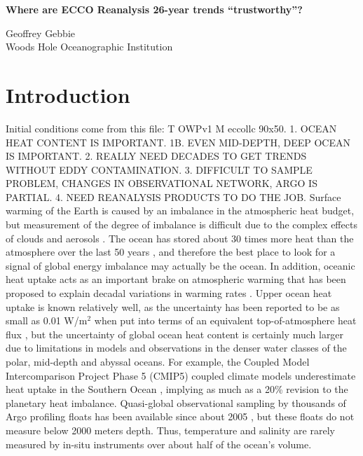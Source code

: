\documentclass[authoryear,round,12pt]{article}
\begin{document}

 

\newpage
\setcounter{page}{0}

\begin{center}

 \bigskip
 
  \textbf{{\Large Where are ECCO Reanalysis 26-year trends  ``trustworthy''?}}

 \bigskip
 Geoffrey Gebbie \\
Woods Hole Oceanographic Institution
\end{center}


\medskip
\newpage

\setcounter{page}{1}

\section{Introduction} 
\label{sec:introduction}

Initial conditions come from this file: T OWPv1 M eccollc 90x50.
1. OCEAN HEAT CONTENT IS IMPORTANT.  1B. EVEN MID-DEPTH, DEEP OCEAN IS
IMPORTANT.  2. REALLY NEED DECADES TO GET TRENDS WITHOUT EDDY
CONTAMINATION.  3. DIFFICULT TO SAMPLE PROBLEM, CHANGES IN
OBSERVATIONAL NETWORK, ARGO IS PARTIAL.  4. NEED REANALYSIS PRODUCTS
TO DO THE JOB.  Surface warming of the Earth is caused by an imbalance
in the atmospheric heat budget, but measurement of the degree of
imbalance is difficult due to the complex effects of clouds and
aerosols \cite[e.g.,]{Myhre-Shindell-2013:Anthropogenic}. The ocean
has stored about 30 times more heat than the atmosphere over the last
50 years
\citep[e.g.,][]{Levitus-Antonov-2005:Warming,Lyman-Johnson-2014:Estimating},
and therefore the best place to look for a signal of global energy
imbalance may actually be the ocean. In addition, oceanic heat uptake
acts as an important brake on atmospheric warming that has been
proposed to explain decadal variations in warming rates
\citep[e.g.,][]{Meehl-Arblaster-2011:Model,Trenberth-Fasullo-2013:apparent}. Upper
ocean heat uptake is known relatively well, as the uncertainty has
been reported to be as small as 0.01 W/m$^2$ when put into terms of an
equivalent top-of-atmosphere heat flux
\citep{Balmaseda-Trenberth-2013:Distinctive}, but the uncertainty of
global ocean heat content is certainly much larger due to limitations
in models and observations in the denser water classes of the polar,
mid-depth and abyssal oceans. For example, the Coupled Model
Intercomparison Project Phase 5 (CMIP5) coupled climate models
underestimate heat uptake in the Southern Ocean
\citep{Durack-Gleckler-2014:Quantifying}, implying as much as a 20\%
revision to the planetary heat imbalance. Quasi-global observational
sampling by thousands of Argo profiling floats has been available
since about 2005 \citep[e.g.,][]{Wijffels-Roemmich-2016:Ocean}, but
these floats do not measure below 2000 meters depth. Thus, temperature
and salinity are rarely measured by in-situ instruments over about
half of the ocean's volume.
\end{document}
